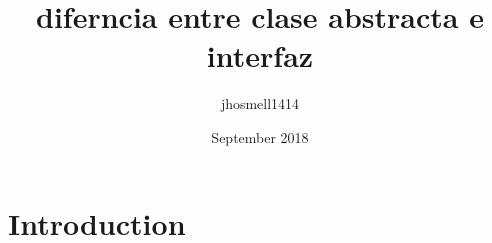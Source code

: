 \documentclass{article}
\title{diferncia entre clase abstracta e interfaz}
\author{jhosmell1414 }
\date{September 2018}
\begin{document}
\maketitle

\section{Introduction}
\end{document}
